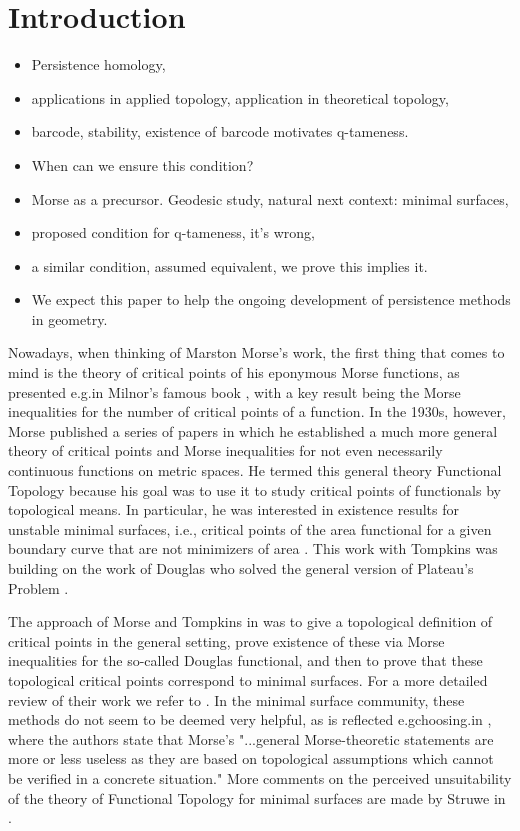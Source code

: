 
\section{Introduction}

\begin{itemize}
	\item Persistence homology, 
	\item applications in applied topology, application in theoretical topology, 
	\item barcode, stability, existence of barcode motivates q-tameness. 
	\item When can we ensure this condition? 
	\item Morse as a precursor. Geodesic study, natural next context: minimal surfaces, \item proposed condition for q-tameness, it's wrong, 
	\item a similar condition, assumed equivalent, we prove this implies it.
	\item We expect this paper to help the ongoing development of persistence methods in geometry.
\end{itemize}

Nowadays, when thinking of Marston Morse's work, the first thing that comes to mind is the theory of critical points of his eponymous Morse functions, as presented e.g.\@ in Milnor's famous book \cite{MR0163331}, with a key result being the Morse inequalities for the number of critical points of a function. In the 1930s, however, Morse published a series of papers \cite{Morse.1937, Morse.1938, Morse.1940, MR9102} in which he established a much more general theory of critical points and Morse inequalities for not even necessarily continuous functions on metric spaces. He termed this general theory Functional Topology because his goal was to use it to study critical points of functionals by topological means. In particular, he was interested in existence results for unstable minimal surfaces, i.e., critical points of the area functional for a given boundary curve that are not minimizers of area \cite{Morse.1939,Morse.1941}. This work with Tompkins was building on the work of Douglas who solved the general version of Plateau's Problem \cite{Douglas.1931}.

The approach of Morse and Tompkins in \cite{Morse.1939} was to give a topological definition of critical points in the general setting, prove existence of these via Morse inequalities for the so-called Douglas functional, and then to prove that these topological critical points correspond to minimal surfaces. For a more detailed review of their work we refer to \cite{Struwe.1988}. In the minimal surface community, these methods do not seem to be deemed very helpful, as is reflected e.gchoosing.\@ in \cite[p.472]{MR2566897}, where the authors state that Morse's "...general Morse-theoretic statements are more or less useless as they are based on topological assumptions which cannot be verified in a concrete situation." More comments on the perceived unsuitability of the theory of Functional Topology for minimal surfaces are made by Struwe in \cite{MR850612}. 

